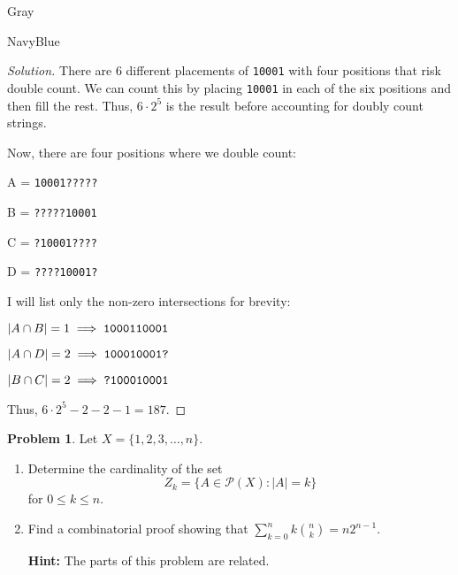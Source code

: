 \documentclass[12pt]{amsart}
\newcounter{problem_number}[section]
\theoremstyle{named}
\newenvironment{soln}
{\begin{color}{Gray}\begin{framed}\begin{color}{NavyBlue}\begin{proof}[Solution]
\doublespacing}
{\end{proof}\end{color}\end{framed}\end{color}}
\theoremstyle{definition}
\newtheorem{problem}{Problem}
\begin{document}
\begin{soln}
    \phantom{ }

    \noindent There are $6$ different placements of \verb|10001| with four
    positions that risk double count. We can count this by placing \verb|10001|
    in each of the six positions and then fill the rest. Thus, $6 \cdot 2^5$ is
    the result before accounting for doubly count strings.

    \noindent Now, there are four positions where we double count:

	A = \verb|10001?????|

	B = \verb|?????10001|
	
	C = \verb|?10001????|

	D = \verb|????10001?|

	\noindent I will list only the non-zero intersections for brevity:

	$|A \cap B| = 1 \implies \verb|1000110001|$
	
	$|A \cap D| = 2 \implies \verb|100010001?|$

	$|B \cap C| = 2 \implies  \verb|?100010001|$

    \noindent Thus, $6 \cdot 2^5 - 2 - 2 - 1 = 187$. 

\end{soln}



\begin{problem}
	Let $X=\{1,2,3,\ldots,n\}$.
	\begin{enumerate}
		\item Determine the cardinality of the set 
		$$Z_k = \{A\in\mathscr{P}(X)\colon |A|=k\}$$
		for $0\leq k\leq n$.
	\item Find a combinatorial proof showing that $\displaystyle\sum_{k=0}^nk\binom{n}{k} = n2^{n-1}$.

	\textbf{Hint:} The parts of this problem are related.
	\end{enumerate}
\end{problem}
\end{document}
